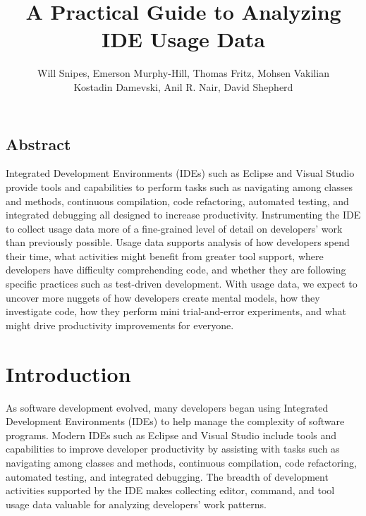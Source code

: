 \documentclass[authoryear]{elsarticle}
\begin{document}
%
\title{A Practical Guide to Analyzing IDE Usage Data\vspace{-0ex}}

\author{
Will Snipes, Emerson Murphy-Hill,
Thomas Fritz, Mohsen Vakilian \\
Kostadin Damevski,
Anil R. Nair, David Shepherd
}
\maketitle
\thispagestyle{empty}
\pagestyle{empty}

\begin{center}
\section*{Abstract}
\end{center}
Integrated Development Environments (IDEs) such as Eclipse and Visual Studio provide tools and capabilities to perform tasks such as navigating among classes and methods, continuous compilation, code refactoring, automated testing, and integrated debugging all designed to increase productivity.  Instrumenting the IDE to collect usage data more of a fine-grained level of detail on developers' work than previously possible.  Usage data supports analysis of how developers spend their time, what activities might benefit from greater tool support, where developers have difficulty comprehending code, and whether they are following specific practices such as test-driven development.  With usage data, we expect to uncover more nuggets of how developers create mental models, how they investigate code, how they perform mini trial-and-error experiments, and what might drive productivity improvements for everyone.

\section{Introduction}
As software development evolved, many developers began using Integrated Development Environments (IDEs) to help manage the complexity of software programs.  Modern IDEs such as Eclipse and Visual Studio include tools and capabilities to improve developer productivity by assisting with tasks such as navigating among classes and methods, continuous compilation, code refactoring, automated testing, and integrated debugging.  The breadth of development activities supported by the IDE makes collecting editor, command, and tool usage data valuable for analyzing developers' work patterns.  
\end{document}

